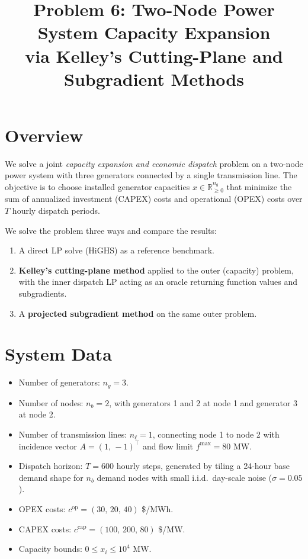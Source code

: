 \documentclass[11pt]{article}
\title{Problem 6: Two-Node Power System Capacity Expansion \\
       via Kelley's Cutting-Plane and Subgradient Methods}
\author{}
\date{}
\begin{document}
\maketitle

\section{Overview}
We solve a joint \emph{capacity expansion and economic dispatch} problem
on a two-node power system with three generators connected by a single
transmission line. The objective is to choose installed generator
capacities $x \in \mathbb{R}^{n_g}_{\ge 0}$ that minimize the sum of
annualized investment (CAPEX) costs and operational (OPEX) costs over
$T$ hourly dispatch periods.

We solve the problem three ways and compare the results:
\begin{enumerate}
    \item A direct LP solve (HiGHS) as a reference benchmark.
    \item \textbf{Kelley's cutting-plane method} applied to the outer
          (capacity) problem, with the inner dispatch LP acting as an
          oracle returning function values and subgradients.
    \item A \textbf{projected subgradient method} on the same outer
          problem.
\end{enumerate}

\section{System Data}
\begin{itemize}
    \item Number of generators: $n_g = 3$.
    \item Number of nodes: $n_b = 2$, with generators 1 and 2 at node 1
          and generator 3 at node 2.
    \item Number of transmission lines: $n_\ell = 1$, connecting node 1 to
          node 2 with incidence vector $A = (1,\, -1)^\top$ and flow limit
          $f^{\max} = 80$ MW.
    \item Dispatch horizon: $T = 600$ hourly steps, generated by tiling a
          24-hour base demand shape for $n_b$ demand nodes with small
          i.i.d.\ day-scale noise ($\sigma = 0.05$).
    \item OPEX costs: $c^{\text{op}} = (30,\, 20,\, 40)$ \$/MWh.
    \item CAPEX costs: $c^{\text{cap}} = (100,\, 200,\, 80)$ \$/MW.
    \item Capacity bounds: $0 \le x_i \le 10^4$ MW.
\end{itemize}
\end{document}
